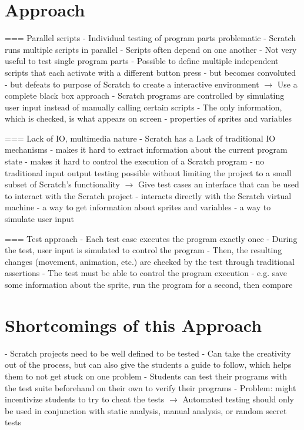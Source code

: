 \section{Approach}
=== Parallel scripts
- Individual testing of program parts problematic
    - Scratch runs multiple scripts in parallel
        - Scripts often depend on one another
    - Not very useful to test single program parts
    - Possible to define multiple independent scripts that each activate with a different button press
        - but becomes convoluted
        - but defeats to purpose of Scratch to create a interactive environment
$\rightarrow$ Use a complete black box approach
    - Scratch programs are controlled by simulating user input instead of manually calling certain scripts
    - The only information, which is checked, is what appears on screen
        - properties of sprites and variables

=== Lack of IO, multimedia nature
- Scratch has a Lack of traditional IO mechanisms
    - makes it hard to extract information about the current program state
    - makes it hard to control the execution of a Scratch program
    - no traditional input output testing possible without limiting the project to a small subset of Scratch's functionality
$\rightarrow$ Give test cases an interface that can be used to interact with the Scratch project
    - interacts directly with the Scratch virtual machine
    - a way to get information about sprites and variables
    - a way to simulate user input

=== Test approach
- Each test case executes the program exactly once
- During the test, user input is simulated to control the program
- Then, the resulting changes (movement, animation, etc.) are checked by the test through traditional assertions
- The test must be able to control the program execution
    - e.g. save some information about the sprite, run the program for a second, then compare

\section{Shortcomings of this Approach}
- Scratch projects need to be well defined to be tested
    - Can take the creativity out of the process, but can also give the students a guide to follow, which helps them to not get stuck on one problem
    - Students can test their programs with the test suite beforehand on their own to verify their programs
    - Problem: might incentivize students to try to cheat the tests
        $\rightarrow$ Automated testing should only be used in conjunction with static analysis, manual analysis, or random secret tests


